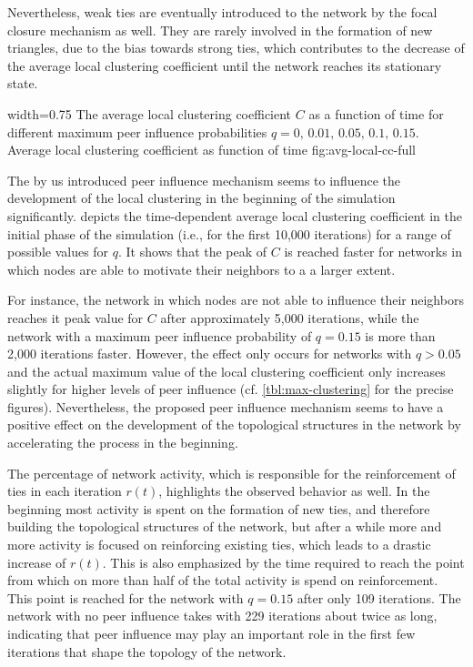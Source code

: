 Nevertheless, weak ties are eventually introduced to the network by the focal closure mechanism as well.
They are rarely involved in the formation of new triangles, due to the bias towards strong ties, which contributes to the decrease of the average local clustering coefficient until the network reaches its stationary state.


      {width=0.75\textwidth}
      {The average local clustering coefficient \( C \) as a function of time for different maximum peer influence probabilities \( q = 0, \, 0.01, \, 0.05, \, 0.1, \, 0.15\). }
      {Average local clustering coefficient as function of time}
      {fig:avg-local-cc-full}


The by us introduced peer influence mechanism seems to influence the development of the local clustering in the beginning of the simulation significantly.
 depicts the time-dependent average local clustering coefficient in the initial phase of the simulation (i.e., for the first 10,000 iterations) for a range of possible values for \( q \).
It shows that the peak of \( C \) is reached faster for networks in which nodes are able to motivate their neighbors to a a larger extent.

For instance, the network in which nodes are not able to influence their neighbors reaches it peak value for \( C \) after approximately 5,000 iterations, while the network with a maximum peer influence probability of \( q = 0.15 \) is more than 2,000 iterations faster.
However, the effect only occurs for networks with \( q > 0.05 \) and the actual maximum value of the local clustering coefficient only increases slightly for higher levels of peer influence (cf. \cref{tbl:max-clustering} for the precise figures).
Nevertheless, the proposed peer influence mechanism seems to have a positive effect on the development of the topological structures in the network by accelerating the process in the beginning.

The percentage of network activity, which is responsible for the reinforcement of ties in each iteration \( r(t) \), highlights the observed behavior as well.
In the beginning most activity is spent on the formation of new ties, and therefore building the topological structures of the network, but after a while more and more activity is focused on reinforcing existing ties, which leads to a drastic increase of \( r(t) \).
This is also emphasized by the time required to reach the point from which on more than half of the total activity is spend on reinforcement.
This point is reached for the network with \( q = 0.15 \) after only 109 iterations.
The network with no peer influence takes with 229 iterations about twice as long, indicating that peer influence may play an important role in the first few iterations that shape the topology of the network.


